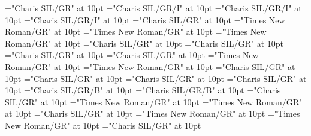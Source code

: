 \documentclass[a4paper,twoside]{article}
\begin{document}
\font\xitemexamplessensesensesentryletDatadicBody="Charis SIL/GR" at 10pt
\font\examplesehxitemexamplessensesensesentryletDatadicBody="Charis SIL/GR/I" at 10pt
\font\spansehexamplesehxitemexamplessensesensesentryletDatadicBody="Charis SIL/GR/I" at 10pt
\font\spanenexamplesehxitemexamplessensesensesentryletDatadicBody="Charis SIL/GR/I" at 10pt
\font\translationsxitemexamplessensesensesentryletDatadicBody="Charis SIL/GR" at 10pt
\font\translationLcpttranslationsxitemexamplessensesensesentryletDatadicBody="Times New Roman/GR" at 10pt
\font\xitempttranslationLcpttranslationsxitemexamplessensesensesentryletDatadicBody="Times New Roman/GR" at 10pt
\font\spanptxitempttranslationLcpttranslationsxitemexamplessensesensesentryletDatadicBody="Times New Roman/GR" at 10pt
\font\spanentranslationLcpttranslationsxitemexamplessensesensesentryletDatadicBody="Charis SIL/GR" at 10pt
\font\xitementranslationLcpttranslationsxitemexamplessensesensesentryletDatadicBody="Charis SIL/GR" at 10pt
\font\spanenxitementranslationLcpttranslationsxitemexamplessensesensesentryletDatadicBody="Charis SIL/GR" at 10pt
\font\xitementryreftypeprimaryrefsentryletDatadicBody="Charis SIL/GR" at 10pt
\font\LexEntryTypepublishStemEntryTypeAbbreviationPubptxitementryreftypeprimaryrefsentryletDatadicBody="Times New Roman/GR" at 10pt
\font\spanptLexEntryTypepublishStemEntryTypeAbbreviationPubptxitementryreftypeprimaryrefsentryletDatadicBody="Times New Roman/GR" at 10pt
\font\spanenLexEntryTypepublishStemEntryTypeAbbreviationPubptxitementryreftypeprimaryrefsentryletDatadicBody="Charis SIL/GR" at 10pt
\font\relationssensesensesentryletDatadicBody="Charis SIL/GR" at 10pt
\font\lexreftargetsrelationssensesensesentryletDatadicBody="Charis SIL/GR" at 10pt
\font\alexreftargetsrelationssensesensesentryletDatadicBody="Charis SIL/GR" at 10pt
\font\sensecrossrefsehalexreftargetsrelationssensesensesentryletDatadicBody="Charis SIL/GR/B" at 10pt
\font\xsensexrefnumbersensecrossrefsehalexreftargetsrelationssensesensesentryletDatadicBody="Charis SIL/GR/B" at 10pt
\font\spanenrelationssensesensesentryletDatadicBody="Charis SIL/GR" at 10pt
\font{}="Times New Roman/GR" at 10pt
\font\spanptdefinitionptsensesensesentryletDatadicBody="Times New Roman/GR" at 10pt
\font\spanendefinitionptsensesensesentryletDatadicBody="Charis SIL/GR" at 10pt
\font\translationpttranslationsxitemexamplessensesensesentryletDatadicBody="Times New Roman/GR" at 10pt
\font\spanpttranslationpttranslationsxitemexamplessensesensesentryletDatadicBody="Times New Roman/GR" at 10pt
\font\spanentranslationpttranslationsxitemexamplessensesensesentryletDatadicBody="Charis SIL/GR" at 10pt
\end{document}
